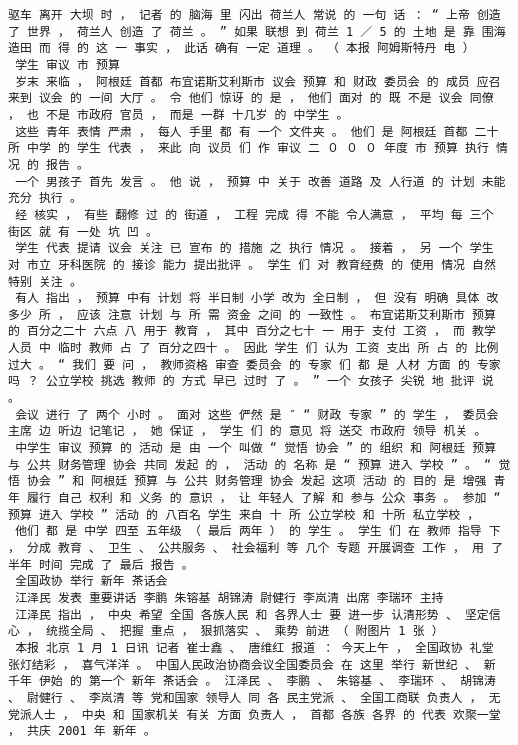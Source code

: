 \documentclass{article}
\begin{document}
\begin{Verbatim}[commandchars=\\\{\}]
 驱车 离开 大坝 时 ， 记者 的 脑海 里 闪出 荷兰人 常说 的 一句 话 ： “ 上帝 创造 了 世界 ， 荷兰人 创造 了 荷兰 。 ” 如果 联想 到 荷兰 1 ／ 5 的 土地 是 靠 围海 造田 而 得 的 这 一 事实 ， 此话 确有 一定 道理 。 （ 本报 阿姆斯特丹 电 ） 
 学生 审议 市 预算 
 岁末 来临 ， 阿根廷 首都 布宜诺斯艾利斯市 议会 预算 和 财政 委员会 的 成员 应召 来到 议会 的 一间 大厅 。 令 他们 惊讶 的 是 ， 他们 面对 的 既 不是 议会 同僚 ， 也 不是 市政府 官员 ， 而是 一群 十几岁 的 中学生 。 
 这些 青年 表情 严肃 ， 每人 手里 都 有 一个 文件夹 。 他们 是 阿根廷 首都 二十 所 中学 的 学生 代表 ， 来此 向 议员 们 作 审议 二 ０ ０ ０ 年度 市 预算 执行 情况 的 报告 。 
 一个 男孩子 首先 发言 。 他 说 ， 预算 中 关于 改善 道路 及 人行道 的 计划 未能 充分 执行 。 
 经 核实 ， 有些 翻修 过 的 街道 ， 工程 完成 得 不能 令人满意 ， 平均 每 三个 街区 就 有 一处 坑 凹 。 
 学生 代表 提请 议会 关注 已 宣布 的 措施 之 执行 情况 。 接着 ， 另 一个 学生 对 市立 牙科医院 的 接诊 能力 提出批评 。 学生 们 对 教育经费 的 使用 情况 自然 特别 关注 。 
 有人 指出 ， 预算 中有 计划 将 半日制 小学 改为 全日制 ， 但 没有 明确 具体 改 多少 所 ， 应该 注意 计划 与 所 需 资金 之间 的 一致性 。 布宜诺斯艾利斯市 预算 的 百分之二十 六点 八 用于 教育 ， 其中 百分之七十 一 用于 支付 工资 ， 而 教学 人员 中 临时 教师 占 了 百分之四十 。 因此 学生 们 认为 工资 支出 所 占 的 比例 过大 。 “ 我们 要 问 ， 教师资格 审查 委员会 的 专家 们 都 是 人材 方面 的 专家 吗 ？ 公立学校 挑选 教师 的 方式 早已 过时 了 。 ” 一个 女孩子 尖锐 地 批评 说 。 
 会议 进行 了 两个 小时 。 面对 这些 俨然 是 ″ “ 财政 专家 ” 的 学生 ， 委员会 主席 边 听边 记笔记 ， 她 保证 ， 学生 们 的 意见 将 送交 市政府 领导 机关 。 
 中学生 审议 预算 的 活动 是 由 一个 叫做 “ 觉悟 协会 ” 的 组织 和 阿根廷 预算 与 公共 财务管理 协会 共同 发起 的 ， 活动 的 名称 是 “ 预算 进入 学校 ” 。 “ 觉悟 协会 ” 和 阿根廷 预算 与 公共 财务管理 协会 发起 这项 活动 的 目的 是 增强 青年 履行 自己 权利 和 义务 的 意识 ， 让 年轻人 了解 和 参与 公众 事务 。 参加 “ 预算 进入 学校 ” 活动 的 八百名 学生 来自 十 所 公立学校 和 十所 私立学校 ， 
 他们 都 是 中学 四至 五年级 （ 最后 两年 ） 的 学生 。 学生 们 在 教师 指导 下 ， 分成 教育 、 卫生 、 公共服务 、 社会福利 等 几个 专题 开展调查 工作 ， 用 了 半年 时间 完成 了 最后 报告 。 
 全国政协 举行 新年 茶话会 
 江泽民 发表 重要讲话 李鹏 朱镕基 胡锦涛 尉健行 李岚清 出席 李瑞环 主持 
 江泽民 指出 ， 中央 希望 全国 各族人民 和 各界人士 要 进一步 认清形势 、 坚定信心 ， 统揽全局 、 把握 重点 ， 狠抓落实 、 乘势 前进 （ 附图片 1 张 ） 
 本报 北京 1 月 1 日讯 记者 崔士鑫 、 唐维红 报道 ： 今天上午 ， 全国政协 礼堂 张灯结彩 ， 喜气洋洋 。 中国人民政治协商会议全国委员会 在 这里 举行 新世纪 、 新 千年 伊始 的 第一个 新年 茶话会 。 江泽民 、 李鹏 、 朱镕基 、 李瑞环 、 胡锦涛 、 尉健行 、 李岚清 等 党和国家 领导人 同 各 民主党派 、 全国工商联 负责人 ， 无党派人士 ， 中央 和 国家机关 有关 方面 负责人 ， 首都 各族 各界 的 代表 欢聚一堂 ， 共庆 2001 年 新年 。 

\end{Verbatim}
\end{document}
